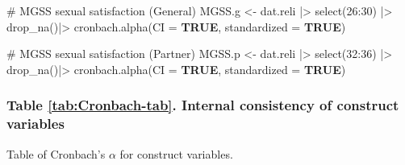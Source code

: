 \documentclass[
  bookmarksnumbered]{article}
\newenvironment{Shaded}{\begin{snugshade}}{\end{snugshade}}
\newcommand{\AttributeTok}[1]{\textcolor[rgb]{0.80,0.80,0.80}{#1}}
\newcommand{\CommentTok}[1]{\textcolor[rgb]{0.50,0.62,0.50}{#1}}
\newcommand{\ConstantTok}[1]{\textcolor[rgb]{0.86,0.64,0.64}{\textbf{#1}}}
\newcommand{\DecValTok}[1]{\textcolor[rgb]{0.86,0.86,0.80}{#1}}
\newcommand{\FunctionTok}[1]{\textcolor[rgb]{0.94,0.94,0.56}{#1}}
\newcommand{\NormalTok}[1]{\textcolor[rgb]{0.80,0.80,0.80}{#1}}
\newcommand{\OtherTok}[1]{\textcolor[rgb]{0.94,0.94,0.56}{#1}}
\newcommand{\SpecialCharTok}[1]{\textcolor[rgb]{0.86,0.64,0.64}{#1}}
\begin{document}
\begin{Shaded}
\begin{Highlighting}[]
\CommentTok{\# MGSS sexual satisfaction (General)}
\NormalTok{MGSS.g }\OtherTok{\textless{}{-}}\NormalTok{ dat.reli }\SpecialCharTok{|\textgreater{}}
  \FunctionTok{select}\NormalTok{(}\DecValTok{26}\SpecialCharTok{:}\DecValTok{30}\NormalTok{) }\SpecialCharTok{|\textgreater{}} 
  \FunctionTok{drop\_na}\NormalTok{()}\SpecialCharTok{|\textgreater{}} 
  \FunctionTok{cronbach.alpha}\NormalTok{(}\AttributeTok{CI =} \ConstantTok{TRUE}\NormalTok{, }\AttributeTok{standardized =} \ConstantTok{TRUE}\NormalTok{)}

\CommentTok{\# MGSS sexual satisfaction (Partner)}
\NormalTok{MGSS.p }\OtherTok{\textless{}{-}}\NormalTok{ dat.reli }\SpecialCharTok{|\textgreater{}}
  \FunctionTok{select}\NormalTok{(}\DecValTok{32}\SpecialCharTok{:}\DecValTok{36}\NormalTok{) }\SpecialCharTok{|\textgreater{}} 
  \FunctionTok{drop\_na}\NormalTok{()}\SpecialCharTok{|\textgreater{}} 
  \FunctionTok{cronbach.alpha}\NormalTok{(}\AttributeTok{CI =} \ConstantTok{TRUE}\NormalTok{, }\AttributeTok{standardized =} \ConstantTok{TRUE}\NormalTok{)}
\end{Highlighting}
\end{Shaded}

\hypertarget{table-reftabcronbach-tab.-internal-consistency-of-construct-variables}{%
\subsubsection{Table \ref{tab:Cronbach-tab}. Internal consistency of construct variables}\label{table-reftabcronbach-tab.-internal-consistency-of-construct-variables}}

Table of Cronbach's \(\alpha\) for construct variables.
\end{document}
